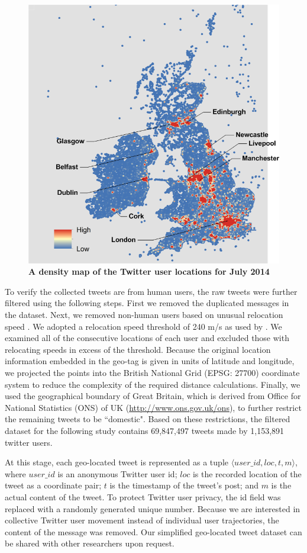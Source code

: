 \documentclass[10pt,letterpaper]{article}
\begin{document}
\begin{figure}[ht]
\includegraphics[width=0.7\linewidth]{./figure/PNG/S2_twitter_density_Fig_1}
\caption{{\bf A density map of the Twitter user locations for July 2014}}
\label{S2_Fig}
\end{figure}

To verify the collected tweets are from human users, the raw tweets were further filtered using the following steps. 
First we removed the duplicated messages in the dataset.
Next, we removed non-human users based on unusual relocation speed \cite{hawelka,jurdak2015}. 
We adopted a relocation speed threshold of 240 m/s as used by \cite{jurdak2015}. 
We examined all of the consecutive locations of each user and excluded those with relocating speeds in excess of the threshold.
Because the original location information embedded in the geo-tag is given in units of latitude and longitude, we projected the points into the British National Grid (EPSG: 27700) coordinate system to reduce the complexity of the required distance calculations. 
Finally, we used the geographical boundary of Great Britain, which is derived from Office for National Statistics (ONS) of UK (\url{http://www.ons.gov.uk/ons}), to further restrict the remaining tweets to be ``domestic".
Based on these restrictions, the filtered dataset for the following study contains 69,847,497 tweets made by 1,153,891 twitter users.

At this stage, each geo-located tweet is represented as a tuple $\langle user\_id, loc, t, m \rangle$, where $user\_id$ is an anonymous Twitter user id; $loc$ is the recorded location of the tweet as a coordinate pair; $t$ is the timestamp of the tweet's post; and $m$ is the actual content of the tweet. 
To protect Twitter user privacy, the id field was replaced with a randomly generated unique number. 
Because we are interested in collective Twitter user movement instead of individual user trajectories, the content of the message was removed. 
Our simplified geo-located tweet dataset can be shared with other researchers upon request.
\end{document}

